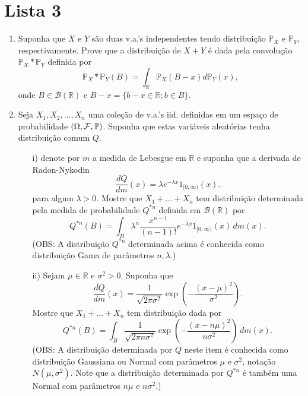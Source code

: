 \chapter*{Lista 3}
\chaptermark{}


\begin{enumerate}[leftmargin=*]


\item 
Suponha que $X$ e $Y$ são duas v.a.'s independentes
tendo distribuição $\mathbb{P}_X$ e $\mathbb{P}_{Y}$,
respectivamente. Prove que a distribuição de $X+Y$ 
é dada pela convolução $\mathbb{P}_X*\mathbb{P}_Y$
definida por
\[
	\mathbb{P}_X*\mathbb{P}_Y(B)
	=
	\int_{\mathbb{R}} \mathbb{P}_X(B-x)d\mathbb{P}_Y(x),
\]
onde $B\in\mathscr{B}(\mathbb{R})$ e 
$B-x=\{b-x\in\mathbb{R}; b\in B\}$.










\item 
Seja $X_1,X_2,\ldots, X_n$ uma coleção de v.a.'s iid.
definidas em um espaço de probabilidade $(\Omega,\mathcal{F},\mathbb{P})$.
Suponha que estas variáveis aleatórias tenha distribuição 
comum $Q$.
%
%
%
	\begin{itemize}
	\item[i)]
	denote por $m$ a medida de Lebesgue em $\mathbb{R}$ e
	suponha que a derivada de Radon-Nykodin 
		\[
			\frac{dQ}{dm}(x) = \lambda e^{-\lambda x}1_{[0,\infty)}(x).
		\]
	para algum $\lambda>0$. Mostre que $X_1+\ldots+X_n$ 
	tem distribuição determinada pela medida
	de probabilidade $Q^{*n}$ definida em $\mathscr{B}(\mathbb{R})$
	por 
	\[
		Q^{*n}(B) = 
		\int_{B} \lambda^n \frac{x^{n-1}}{(n-1)!}e^{-\lambda x}
		1_{[0,\infty)}(x)\, dm(x).
	\]
	(OBS: A distribuição $Q^{*n}$ determinada acima é conhecida como distribuição 
	Gama de parâmetros $n,\lambda$.)
	
	\item[ii)] 
	Sejam $\mu\in \mathbb{R}$  e $\sigma^2>0$. 
	Suponha que  
		\[
			\frac{dQ}{dm}(x) = \frac{1}{\sqrt{2\pi \sigma^2}}
			\exp\left( -\frac{(x-\mu)^2}{\sigma^2} \right).
		\]	
	Mostre que $X_1+\ldots+X_n$ tem distribuição dada por 
		\[
			Q^{*n}(B) = 
			\int_{B}\frac{1}{\sqrt{2\pi n\sigma^2}}
			\exp\left( -\frac{(x-n\mu)^2}{n\sigma^2} \right)
			\, dm(x).
		\]
	(OBS: A distribuição determinada por $Q$ neste item é conhecida como distribuição 
	Gaussiana ou Normal com parâmetros $\mu$ e $\sigma^2$, notação $N(\mu,\sigma^2)$.
	Note que a distribuição determinada por $Q^{*n}$ é também uma Normal com 
	parâmetros $n\mu$ e $n\sigma^2$.)
	

\end{itemize}
\end{enumerate}
